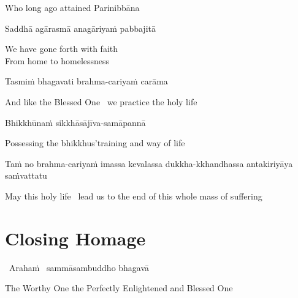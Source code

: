 \begin{english}
  Who long ago attained Parinibbāna
\end{english}

Saddhā agārasmā anagāriyaṁ pabbajitā

\begin{english}
  We have gone forth with faith\\
  From home to homelessness
\end{english}

Tasmiṁ bhagavati brahma-cariyaṁ carāma

\begin{english}
  And like the Blessed One \breathmark\ we practice the holy life
\end{english}

Bhikkhūnaṁ sikkhāsājīva-samāpannā

\begin{english}
  Possessing the bhikkhus'training and way of life\hyperlink{endnote28-appendix}{\hypertarget{endnote28-body}{}}
\end{english}

\begin{pali-hang}
  Taṁ no brahma-cariyaṁ imassa kevalassa dukkha-kkhandhassa antakiriyāya saṁvattatu
\end{pali-hang}

\begin{english}
  May this holy life \breathmark\ lead us to the end of this whole mass of suffering
\end{english}


\section{Closing Homage}
\label{closing-homage}

\vspace{5pt}

\anglebracketleft\ \hspace{-0.5mm}Arahaṁ \hspace{-0.5mm}\anglebracketright\ sammāsambuddho bhagavā

\begin{english}
  The Worthy One the Perfectly Enlightened and Blessed One
\end{english}

